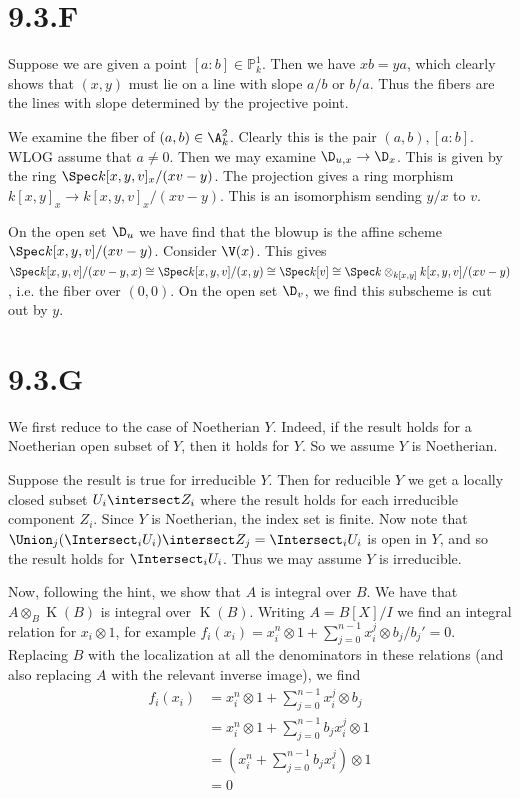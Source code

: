 \documentclass{article}
\begin{document}
\section{9.3.F}
Suppose we are given a point $[a : b] \in \mathbb{P}^1_k$. Then we have
$xb=ya$, which clearly shows that $(x, y)$ must
lie on a line with slope $a/b$ or $b/a$.
Thus the fibers are the lines with slope determined by the projective point.

We examine the fiber of $(a, b) \in \A^2_k$. Clearly this is the pair
$(a,b), [a : b]$. WLOG assume that $a \neq 0$. Then we may
examine $\D_{u, x} \to \D_x$. This is given by the ring
$\Spec k[x, y, v]_x/(xv-y)$. The projection gives a ring morphism
$k[x, y]_x \to k[x, y, v]_x/(xv-y)$. This is an isomorphism sending $y/x$
to $v$.

On the open set $\D_u$ we have find that the blowup is the
affine scheme $\Spec k[x, y, v]/(xv-y)$. Consider $\V(x)$. This
gives $\Spec k[x, y, v]/(xv-y,x) \cong \Spec
	k[x, y, v]/(x, y) \cong \Spec
	k[v] \cong \Spec k \otimes_{k[x, y]}
	k[x,y,v]/(xv-y)$, i.e. the fiber over $(0, 0)$. On
the open set $\D_v$, we find this subscheme is cut out by
$y$.

\section{9.3.G}
We first reduce to the case of Noetherian $Y$. Indeed, if
the result holds for a Noetherian open subset of $Y$, then
it holds for $Y$. So we assume $Y$ is
Noetherian.

Suppose the result is true for irreducible $Y$. Then for
reducible $Y$ we get a locally closed subset
$U_i \intersect Z_i$ where the result holds for each irreducible component
$Z_i$. Since $Y$ is Noetherian, the index
set is finite. Now note that $\Union_j (\Intersect_i U_i) \intersect Z_j = \Intersect_i U_i$ is open in
$Y$, and so the result holds for $\Intersect_i U_i$.
Thus we may assume $Y$ is irreducible.

Now, following the hint, we show that $A$ is integral over
$B$. We have that $A \otimes_B \operatorname{K}(B)$ is integral over
$\operatorname{K}(B)$. Writing $A=B[X]/I$ we find an integral
relation for $x_i \otimes 1$, for example $f_i(x_i)=x_i^n \otimes 1+\sum_{j=0}^{n-1} x_i^j \otimes b_j/b_j'=0$.
Replacing $B$ with the localization at all the denominators
in these relations (and also replacing $A$ with the
relevant inverse image), we find
\begin{align*}
	f_i(x_i) & =x_i^n \otimes 1+\sum_{j=0}^{n-1} x_i^j \otimes b_j  \\
	         & =x_i^n \otimes 1+\sum_{j=0}^{n-1} b_jx_i^j \otimes 1 \\
	         & = (x_i^n+\sum_{j=0}^{n-1} b_jx_i^j) \otimes 1        \\
	         & =0
\end{align*}
\end{document}
